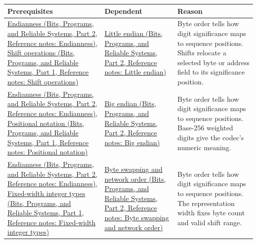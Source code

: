 {\def\LTcaptype{none} %
\begin{longtable}[]{@{}
  >{\raggedright\arraybackslash}p{}
  >{\raggedright\arraybackslash}p{}
  >{\raggedright\arraybackslash}p{}@{}}
\toprule\noalign{}
\begin{minipage}[b]{\linewidth}\raggedright
Prerequisites
\end{minipage} & \begin{minipage}[b]{\linewidth}\raggedright
Dependent
\end{minipage} & \begin{minipage}[b]{\linewidth}\raggedright
Reason
\end{minipage} \\
\midrule\noalign{}
\endhead
\bottomrule\noalign{}
\endlastfoot
\href{../01-Bits-Programs-and-Reliable-Systems-P02/main.pdf\#nameddest=appendix-bc07c3d25b18}{Endianness (Bits, Programs, and Reliable Systems, Part 2, Reference notes: Endianness)}, \href{../01-Bits-Programs-and-Reliable-Systems-P01/main.pdf\#nameddest=appendix-73425b25118e}{Shift operations (Bits, Programs, and Reliable Systems, Part 1, Reference notes: Shift operations)} & \href{../01-Bits-Programs-and-Reliable-Systems-P02/main.pdf\#nameddest=appendix-367b6abf460e}{Little endian (Bits, Programs, and Reliable Systems, Part 2, Reference notes: Little endian)} & Byte order tells how digit significance maps to sequence positions. Shifts relocate a selected byte or address field to its significance position. \\
\href{../01-Bits-Programs-and-Reliable-Systems-P02/main.pdf\#nameddest=appendix-bc07c3d25b18}{Endianness (Bits, Programs, and Reliable Systems, Part 2, Reference notes: Endianness)}, \href{../01-Bits-Programs-and-Reliable-Systems-P01/main.pdf\#nameddest=appendix-83c3f28f7bda}{Positional notation (Bits, Programs, and Reliable Systems, Part 1, Reference notes: Positional notation)} & \href{../01-Bits-Programs-and-Reliable-Systems-P02/main.pdf\#nameddest=appendix-92e040df969a}{Big endian (Bits, Programs, and Reliable Systems, Part 2, Reference notes: Big endian)} & Byte order tells how digit significance maps to sequence positions. Base-256 weighted digits give the codec's numeric meaning. \\
\href{../01-Bits-Programs-and-Reliable-Systems-P02/main.pdf\#nameddest=appendix-bc07c3d25b18}{Endianness (Bits, Programs, and Reliable Systems, Part 2, Reference notes: Endianness)}, \href{../01-Bits-Programs-and-Reliable-Systems-P01/main.pdf\#nameddest=appendix-cc04044b5782}{Fixed-width integer types (Bits, Programs, and Reliable Systems, Part 1, Reference notes: Fixed-width integer types)} & \href{../01-Bits-Programs-and-Reliable-Systems-P02/main.pdf\#nameddest=appendix-11ba36693aa2}{Byte swapping and network order (Bits, Programs, and Reliable Systems, Part 2, Reference notes: Byte swapping and network order)} & Byte order tells how digit significance maps to sequence positions. The representation width fixes byte count and valid shift range. \\

\end{longtable}}
